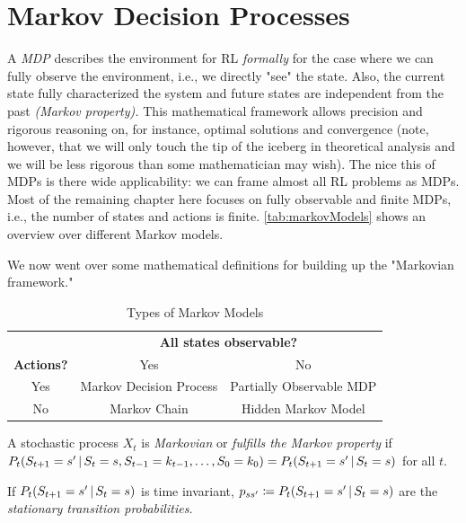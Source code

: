 	\section{Markov Decision Processes}
		A \emph{\ac{MDP}} describes the environment for \ac{RL} \emph{formally} for the case where we can fully observe the environment, i.e., we directly "see" the state. Also, the current state fully characterized the system and future states are independent from the past \emph{(Markov property).} This mathematical framework allows precision and rigorous reasoning on, for instance, optimal solutions and convergence (note, however, that we will only touch the tip of the iceberg in theoretical analysis and we will be less rigorous than some mathematician may wish). The nice this of \acp{MDP} is there wide applicability: we can frame almost all \ac{RL} problems as \acp{MDP}. Most of the remaining chapter here focuses on fully observable and finite \acp{MDP}, i.e., the number of states and actions is finite. \autoref{tab:markovModels} shows an overview over different Markov models.

		We now went over some mathematical definitions for building up the "Markovian framework."

		\begin{table}
			\centering
			\begin{tabular}{c|cc}
				\toprule
				                  & \multicolumn{2}{c}{\textbf{All states observable?}} \\
				\textbf{Actions?} &           Yes           &            No             \\ \midrule
				       Yes        & Markov Decision Process & Partially Observable MDP  \\
				       No         &      Markov Chain       &    Hidden Markov Model    \\ \bottomrule
			\end{tabular}
			\caption{Types of Markov Models}
			\label{tab:markovModels}
		\end{table}

		\begin{definition}
			A stochastic process \(X_t\) is \emph{Markovian} or \emph{fulfills the Markov property} if \( P_t(S_{t + 1} = s' \,\vert\, S_t = s, S_{t - 1} = k_{t - 1}, \dots, S_0 = k_0) = P_t(S_{t + 1} = s' \,\vert\, S_t = s) \) for all \(t\).
		\end{definition}

		\begin{definition}
			If \( P_t(S_{t + 1} = s' \,\vert\, S_t = s) \) is time invariant, \( p_{ss'} \coloneqq P_t(S_{t + 1} = s' \,\vert\, S_t = s) \) are the \emph{stationary transition probabilities.}
		\end{definition}

